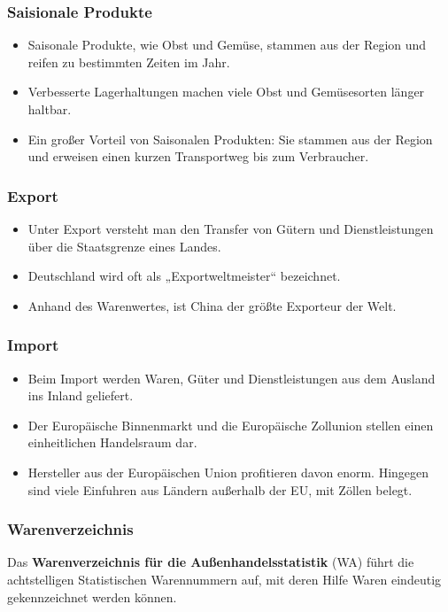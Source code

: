 \documentclass{beamer}
\begin{document}
\begin{frame}
\frametitle{Saisionale Produkte}
  \begin{itemize}
    \item Saisonale Produkte, wie Obst und Gemüse, stammen
      aus der Region und reifen zu bestimmten Zeiten im Jahr.
    \item  Verbesserte Lagerhaltungen machen viele Obst und
      Gemüsesorten länger haltbar.
    \item  Ein großer Vorteil von Saisonalen Produkten: Sie
      stammen aus der Region und erweisen einen kurzen
      Transportweg bis zum Verbraucher.
  \end{itemize}
\end{frame}

\begin{frame}
\frametitle{Export}
  \begin{itemize}
    \item
Unter Export versteht man den Transfer von Gütern und Dienstleistungen über
die Staatsgrenze eines Landes.
    \item
Deutschland wird oft als „Exportweltmeister“ bezeichnet.
    \item
Anhand des Warenwertes, ist China der größte Exporteur der Welt.
  \end{itemize}
\end{frame}

\begin{frame}
\frametitle{Import}
  \begin{itemize}
    \item Beim Import werden Waren, Güter und Dienstleistungen aus dem Ausland ins
      Inland geliefert.
    \item Der Europäische Binnenmarkt und die Europäische Zollunion stellen einen
      einheitlichen Handelsraum dar.
    \item Hersteller aus der Europäischen Union profitieren davon enorm. Hingegen sind
      viele Einfuhren aus Ländern außerhalb der EU, mit Zöllen belegt.
  \end{itemize}
\end{frame}

\begin{frame}
\frametitle{Warenverzeichnis}
Das \textbf{Warenverzeichnis für die Außenhandelsstatistik} (WA) führt die
achtstelligen Statistischen Warennummern auf, mit deren Hilfe Waren
eindeutig gekennzeichnet werden können.
\end{frame}
\end{document}
